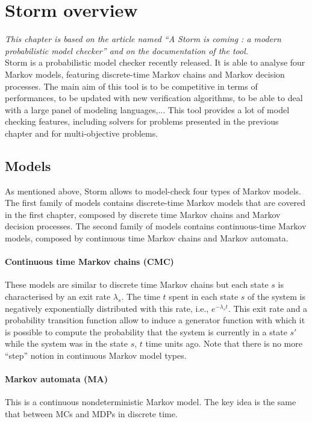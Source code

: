 \chapter{Storm overview}
\textit{This chapter is based on the article named ``A Storm is coming : a modern probabilistic model checker'' \cite{storm1} and on the documentation of the tool.} \\

Storm is a probabilistic model checker recently released. It is able to analyse
four Markov models, featuring discrete-time Markov chains and Markov decision processes. The main aim of this tool is to be competitive in terms of performances, to be updated with new verification algorithms, to be able to
deal with a large panel of modeling languages,... This tool provides %
a lot of model checking features, including solvers for problems presented in the previous chapter and
for multi-objective problems.

\section{Models}
As mentioned above, Storm allows to model-check four types of Markov models.
The first family of models contains discrete-time Markov models that are covered in the first chapter, composed by
discrete time Markov chains and Markov decision processes.
The second family of models contains continuous-time Markov models, composed by continuous time Markov chains and Markov automata.
\subsubsection*{Continuous time Markov chains (CMC)}
These models are similar to discrete time Markov chains but each state $s$ is
characterised by an exit rate $\lambda_s$.
The time $t$ spent in each state $s$ of the system is negatively exponentially distributed with this rate, i.e., $e^{- \lambda_s t}$.
This exit rate and a probability transition function allow to induce a generator
function with which it is possible to compute the probability
that the system is currently in a state $s'$ while the system was in the state $s$, $t$ time units ago. Note that there is no more ``step'' notion in continuous
Markov model types.
\subsubsection*{Markov automata (MA)}
This is a continuous nondeterministic Markov model. The key idea is the same that between MCs and MDPs in discrete time. \\

